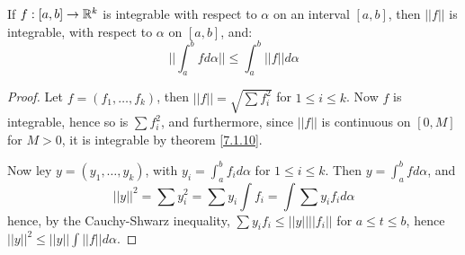 \begin{theorem}\label{6.4.2}
    If $f:[a,b] \rightarrow \mathbb{R}^k$ is integrable with respect to  $\alpha$ on an
    interval  $[a,b]$, then  $||f||$ is integrable, with respect to  $\alpha$ on
    $[a,b]$, and:
        \begin{equation*}
            ||\int_{a}^{b}{f d\alpha}|| \leq \int_{a}^{b}{||f|| d\alpha}		
        \end{equation*} 
\end{theorem}
\begin{proof}
    Let $f=(f_1, \dots, f_k)$, then $||f||=\sqrt{\sum{f_i^2}}$ for  $1 \leq i
    \leq k$. Now  $f$ is integrable, hence so is  $\sum{f_i^2}$, and
    furthermore, since $||f||$	is continuous on $[0,M]$ for  $M>0$, it is
    integrable by theorem \ref{7.1.10}.

    Now ley  $y=(y_1, \dots, y_k)$, with $y_i=\int_{a}^{b}{f_i d\alpha}$ for  $1
    \leq i \leq k$. Then $y=\int_{a}^{b}{f d\alpha}$, and
        \begin{equation*}
            ||y||^2=\sum{y_i^2}=\sum{y_i\int{f_i}}=\int{\sum{y_if_i} d\alpha}
        \end{equation*}
        hence, by the Cauchy-Shwarz inequality, $\sum{y_if_i} \leq ||y||||f_i||$
        for  $a \leq t \leq b$, hence  $||y||^2 \leq ||y||\int{||f|| d\alpha}$.
\end{proof}
